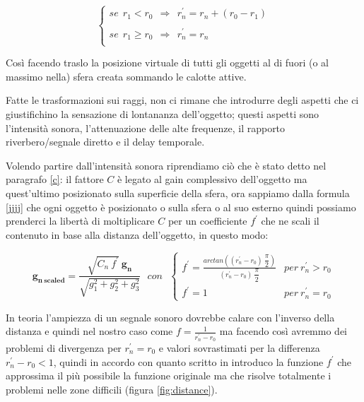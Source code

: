 \documentclass[12pt,a4paper]{report}
\begin{document}
\begin{equation}
\left\{\begin{matrix}
se\ \  r_1 < r_0\ \ \Rightarrow \ \ r_n^{\prime} = r_n+(r_0 - r_1) \\
\\
se\ \  r_1 \geq r_0\ \ \Rightarrow \ \ r_n^{\prime} = r_n\\
\end{matrix}\right.
\label{jjjj}
\end{equation}

Così facendo traslo la posizione virtuale di tutti gli oggetti al di fuori (o al massimo nella) sfera creata sommando le calotte attive.

Fatte le trasformazioni sui raggi, non ci rimane che introdurre degli aspetti che ci giustifichino la sensazione di lontananza dell'oggetto; questi aspetti sono l'intensità sonora, l'attenuazione delle alte frequenze, il rapporto riverbero/segnale diretto e il delay temporale. 

Volendo partire dall'intensità sonora riprendiamo ciò che è stato detto nel paragrafo \ref{c}: il fattore $C$ è legato al gain complessivo dell'oggetto ma quest'ultimo posizionato sulla superficie della sfera, ora sappiamo dalla formula \ref{jjjj} che ogni oggetto è posizionato o sulla sfera o al suo esterno quindi possiamo prenderci la libertà di moltiplicare $C$ per un coefficiente $f^{\prime}$ che ne scali il contenuto in base alla distanza dell'oggetto, in questo modo:

\begin{equation}
\boldsymbol{g_{n\ scaled}} = \dfrac{\sqrt{C_n \ f^{\prime}}\ \boldsymbol{g_n}}{\sqrt{g_1^2 +g_2^2 + g_3^2}} \ \ \ con \ \ \ \left\{\begin{matrix}
f^{\prime}= \frac{arctan\left((r_n^{\prime}-r_0)\ \dfrac{\pi}{2}\right)}{(r_n^{\prime}-r_0)\ \dfrac{\pi}{2}} & per\ r_n^{\prime}>r_0
\\
f^{\prime}=1 & per\ r_n^{\prime}=r_0
\end{matrix}\right.
\label{kkkk}
\end{equation}

In teoria l'ampiezza di un segnale sonoro dovrebbe calare con l'inverso della distanza e quindi nel nostro caso come $f=\frac{1}{r_n^{\prime}-r_0}$ ma facendo così avremmo dei problemi di divergenza per $r_n^{\prime}=r_0$ e valori sovrastimati per la differenza $r_n^{\prime}-r_0<1$, quindi in accordo con quanto scritto in \cite{distanza} introduco la funzione $f^{\prime}$ che approssima il più possibile la funzione originale ma che risolve totalmente i problemi nelle zone difficili (figura \ref{fig:distance}).
\end{document}
